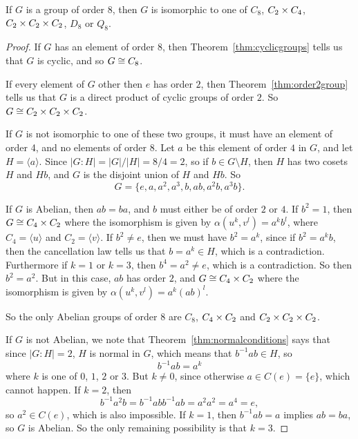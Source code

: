 \begin{theorem}
  If $G$ is a group of order $8$, then $G$ is isomorphic to one of $C_{8}$,
  $C_{2} \times C_{4}$, $C_{2} \times C_{2} \times C_{2}$, $D_{8}$ or $Q_{8}$.
\end{theorem}
\begin{proof}
  If $G$ has an element of order $8$, then Theorem~\ref{thm:cyclicgroups} tells
  us that $G$ is cyclic, and so $G \cong C_{8}$.

  If every element of $G$ other then $e$ has order $2$, then
  Theorem~\ref{thm:order2group} tells us that $G$ is a direct product of
  cyclic groups of order $2$. So $G \cong C_{2} \times C_{2} \times C_{2}$.

  If $G$ is not isomorphic to one of these two groups, it must have an element
  of order 4, and no elements of order 8.  Let $a$ be this element of 
  order $4$ in $G$, and let $H = \langle a \rangle$.  Since $|G : H| = 
  |G|/|H| = 8/4 = 2$, so if $b \in G \setminus H$, then $H$ has two cosets $H$
  and $Hb$, and $G$ is the disjoint union of $H$ and $Hb$.  So
  \[
    G = \{e, a, a^{2}, a^{3}, b, ab, a^{2}b, a^{3}b\}.
  \]

  If $G$ is Abelian, then $ab = ba$, and $b$ must either be of order 
  $2$ or $4$.  If $b^{2} = 1$, then $G \cong C_{4} \times C_{2}$ where 
  the isomorphism is given by $\alpha(u^{k}, v^{l}) = a^{k}b^{l}$, 
  where $C_{4} = \langle u \rangle$ and $C_{2} = \langle v \rangle$.  
  If $b^{2} \ne e$, then we must have $b^{2} = a^{k}$, since if 
  $b^{2} = a^{k}b$, then the cancellation law tells us that $b = a^{k} 
  \in H$, which is a contradiction.  Furthermore if $k = 1$ or $k = 3$, 
  then $b^{4} = a^{2} \ne e$, which is a contradiction.  So then 
  $b^{2} = a^{2}$.  But in this case, $ab$ has order $2$, and $G \cong
  C_{4} \times C_{2}$ where the isomorphism is given by $\alpha(u^{k}, v^{l}) 
  = a^{k}(ab)^{l}$.
  
  So the only Abelian groups of order $8$ are $C_{8}$, $C_{4} \times C_{2}$
  and $C_{2} \times C_{2} \times C_{2}$.

  If $G$ is not Abelian, we note that Theorem~\ref{thm:normalconditions} says
  that since $|G : H| = 2$, $H$ is normal in $G$, which means that $b^{-1}ab
  \in H$, so
  \[
    b^{-1}ab = a^{k}
  \]
  where $k$ is one of $0$, $1$, $2$ or $3$.  But $k \ne 0$, since 
  otherwise $a \in C(e) = \{e\}$, which cannot happen.  If $k = 2$, then
  \[
   b^{-1}a^{2}b = b^{-1}abb^{-1}ab = a^{2}a^{2} = a^{4} = e,
  \]
  so $a^{2} \in C(e)$, which is also impossible.  If $k = 1$, then $b^{-1}ab
  = a$ implies $ab = ba$, so $G$ is Abelian.  So the only remaining
  possibility is that $k = 3$.


\end{proof}
